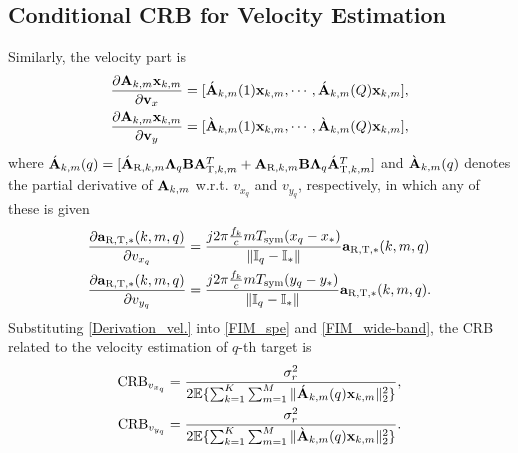 \documentclass[9pt,final,journal,twocolumn]{IEEEtran}
\begin{document}
\subsection{Conditional CRB for Velocity Estimation}
\vspace{-0.1cm}
Similarly, the velocity part is 
\begin{subequations} \label{Derivation_vel.}
\begin{align} 
  \frac{\partial{\bf A}_{k,m}{\bf x}_{k,m}}{\partial{\bf v}_x} &
  = [\acute{\bf A}_{k,m}(1){\bf x}_{k,m},\cdots,\acute{\bf A}_{k,m}(Q){\bf x}_{k,m}], \label{Derivation_vel.1} \\
  \frac{\partial{\bf A}_{k,m}{\bf x}_{k,m}}{\partial{\bf v}_y} &
  =[\grave{\bf A}_{k,m}(1){\bf x}_{k,m},\cdots,\grave{\bf A}_{k,m}(Q){\bf x}_{k,m}], \label{Derivation_vel.2}
\end{align}
\end{subequations}
where $\acute{\bf A}_{k,m}(q)=[{\acute{\bf A}_{\mathrm{R},k,m}}{\bf \Lambda}_{q} {\bf B}{\bf A}_{\mathrm{T},k,m}^T+{\bf A}_{\mathrm{R},k,m}{\bf B}{\bf \Lambda}_{q}{\acute{\bf A}_{\mathrm{T},k,m}^T}]$ and $\grave{\bf A}_{k,m}(q)$ denotes the partial derivative of ${\bf A}_{k,m}$ w.r.t. $v_{x_q}$ and $v_{y_q}$, respectively, in which any of these is given  
\begin{align*} 
\frac{\partial{\bf a}_{\mathrm{R},\mathrm{T},\ast}(k,m,q) }{\partial v_{x_q}}&= \frac{j2\pi\frac{f_k}{c}mT_{\mathrm{sym}}({x}_q-{x}_{\ast})}{{\|{\mathbb I}_{q}-{\mathbb I}_{\ast}\|}}{\bf a}_{\mathrm{R},\mathrm{T},\ast}(k,m,q)\\
\frac{\partial{\bf a}_{\mathrm{R},\mathrm{T},\ast}(k,m,q) }{\partial v_{y_q}}&= \frac{j2\pi\frac{f_k}{c}mT_{\mathrm{sym}}({y}_q-{y}_{\ast})}{{\|{\mathbb I}_{q}-{\mathbb I}_{\ast}\|}}{\bf a}_{\mathrm{R},\mathrm{T},\ast}(k,m,q).
\end{align*}
Substituting \eqref{Derivation_vel.} into \eqref{FIM_spe} and \eqref{FIM_wide-band}, the CRB related to the velocity estimation of $q$-th target is 
\begin{subequations} \label{CRB_vel.q}
\begin{align}
 \mathrm{CRB}_{v_{x_q}}&= \frac{\sigma_r^2}{2\mathbb{E}\{\sum_{k=1}^K\sum_{m=1}^M\|\acute{\bf A}_{k,m}(q){\bf x}_{k,m}\|_2^2\}} ,    \label{CRB_vel.q1}\\
 \mathrm{CRB}_{v_{y_q}}& = \frac{\sigma_r^2}{2\mathbb{E}\{\sum_{k=1}^K\sum_{m=1}^M\|\grave{\bf A}_{k,m}(q){\bf x}_{k,m}\|_2^2\}}. \label{CRB_vel.q2}
%
\end{align}
\end{subequations}
\end{document}
